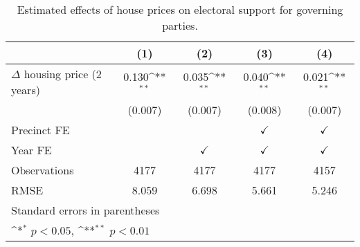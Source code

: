 \begin{table}[htbp]\centering
\def\sym#1{\ifmmode^{#1}\else\(^{#1}\)\fi}
\caption{Estimated effects of house prices on electoral support for governing parties.} \label{prelagiv}
\begin{tabular}{l*{4}{c}}
\hline\hline
                    &\multicolumn{1}{c}{(1)}        &\multicolumn{1}{c}{(2)}        &\multicolumn{1}{c}{(3)}        &\multicolumn{1}{c}{(4)}        \\
\hline
$\Delta$ housing price (2 years)&       0.130\sym{**}&       0.035\sym{**}&       0.040\sym{**}&       0.021\sym{**}\\
                    &     (0.007)        &     (0.007)        &     (0.008)        &     (0.007)        \\
[1em]
\hline Precinct FE  &                    &                    &$\checkmark$        &$\checkmark$        \\
[1em]
Year FE             &                    &$\checkmark$        &$\checkmark$        &$\checkmark$        \\
\hline
Observations        &        4177        &        4177        &        4177        &        4157        \\
RMSE                &       8.059        &       6.698        &       5.661        &       5.246        \\
\hline\hline
\multicolumn{5}{l}{\footnotesize Standard errors in parentheses}\\
\multicolumn{5}{l}{\footnotesize \sym{*} \(p<0.05\), \sym{**} \(p<0.01\)}\\
\end{tabular}
\end{table}
